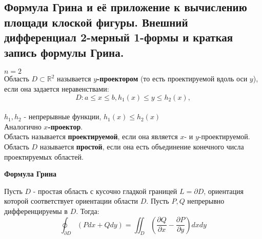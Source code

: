 \subsection{Формула Грина и её приложение к вычислению площади клоской фигуры. Внешний дифференциал 2-мерный 1-формы и краткая запись формулы Грина.}
$n = 2$\\
    Область $D \subset \mathbb{R}^2$ называется \textbf{$y$-проектором} (то есть проектируемой вдоль оси $y$), если она задается неравенствами:\\
    $$D:  a \leq x \leq b, h_1(x)\leq y \leq h_2(x),$$\\
    $h_1, h_2$ - непрерывные функции, $h_1(x) \leq h_2(x)$\\
    Аналогично \textbf{$x$-проектор}.\\
    Область называется \textbf{проектируемой}, если она является $x$- и $y$-проектируемой.\\
    Область $D$ называется \textbf{простой}, если она есть объединение конечного числа проектируемых областей.\\
    \begin{center}
        \textbf{Формула Грина}
    \end{center}
    Пусть $D$ - простая область с кусочно гладкой границей $L = \partial D$, ориентация которой соответствует ориентации области $D$. Пусть $P, Q$ непрерывно дифференцируемы в $D$. Тогда:\\
    $$\oint_{\partial D} (P dx + Q dy) = \iint_D (\frac{\partial Q}{\partial x} - \frac{\partial P}{\partial y})dx dy$$\\
    
